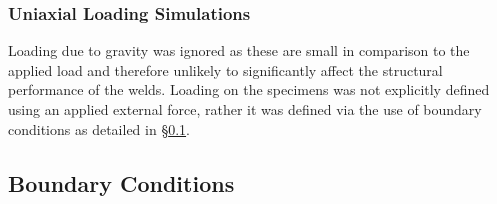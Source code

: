 \subsubsection{Uniaxial Loading Simulations}
\label{FEUniaxialTension}
Loading due to gravity was ignored as these are small in comparison to the applied load and therefore unlikely to significantly affect the structural performance of the welds. Loading on the specimens was not explicitly defined using an applied external force, rather it was defined via the use of boundary conditions as detailed in \S\ref{FEBoundaryConditions}.
\subsection{Boundary Conditions}
\label{FEBoundaryConditions}

